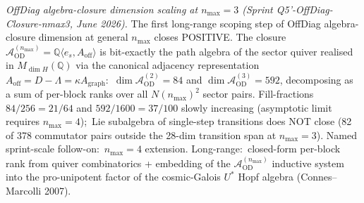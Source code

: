 \documentclass[11pt,a4paper]{article}
\theoremstyle{plain}
\theoremstyle{definition}
\newcommand{\Q}{\mathbb{Q}}
\begin{document}
\emph{OffDiag algebra-closure dimension scaling at $n_{\max} = 3$
(Sprint Q5'-OffDiag-Closure-nmax3, June 2026).}  The first
long-range scoping step of OffDiag algebra-closure dimension at general
$n_{\max}$ closes POSITIVE.  The closure
$\mathcal{A}_{\mathrm{OD}}^{(n_{\max})}
= \Q\langle e_s, A_{\mathrm{off}}\rangle$ is bit-exactly the path
algebra of the sector quiver realised in $M_{\dim H}(\Q)$ via the
canonical adjacency representation $A_{\mathrm{off}}
= D - \Lambda = \kappa A_{\mathrm{graph}}$:\
$\dim \mathcal{A}_{\mathrm{OD}}^{(2)} = 84$ and
$\dim \mathcal{A}_{\mathrm{OD}}^{(3)} = 592$, decomposing as a sum of
per-block ranks over all $N(n_{\max})^2$ sector pairs.  Fill-fractions
$84/256 = 21/64$ and $592/1600 = 37/100$ slowly increasing (asymptotic
limit requires $n_{\max} = 4$);\ Lie subalgebra of single-step
transitions does NOT close (82 of 378 commutator pairs outside the
28-dim transition span at $n_{\max} = 3$).  Named sprint-scale
follow-on:\ $n_{\max} = 4$ extension.  Long-range:\ closed-form
per-block rank from quiver combinatorics + embedding of the
$\mathcal{A}_{\mathrm{OD}}^{(n_{\max})}$ inductive system into the
pro-unipotent factor of the cosmic-Galois $U^*$ Hopf algebra
(Connes--Marcolli 2007).
\end{document}
